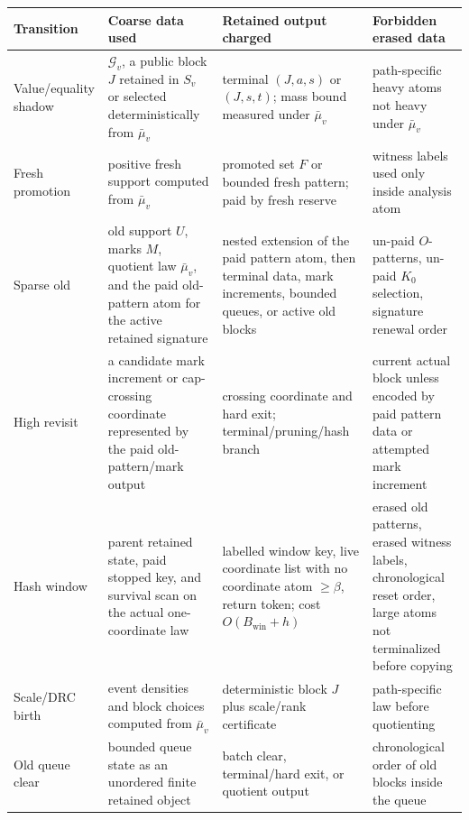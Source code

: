 \documentclass[11pt]{article}
\theoremstyle{remark}
\newcommand{\G}{\mathcal G}
\newcommand{\win}{\mathrm{win}}
\begin{document}
\begin{center}\small
\setlength{\tabcolsep}{3pt}
\renewcommand{\arraystretch}{1.15}
\begin{tabular}{>{\raggedright\arraybackslash}p{}
                >{\raggedright\arraybackslash}p{}
                >{\raggedright\arraybackslash}p{}
                >{\raggedright\arraybackslash}p{}}
\toprule
Transition & Coarse data used & Retained output charged & Forbidden erased data \\
\midrule
Value/equality shadow & $\G_v$, a public block $J$ retained in $S_v$ or selected deterministically from $\bar\mu_v$ & terminal $(J,a,s)$ or $(J,s,t)$; mass bound measured under $\bar\mu_v$ & path-specific heavy atoms not heavy under $\bar\mu_v$ \\
Fresh promotion & positive fresh support computed from $\bar\mu_v$ & promoted set $F$ or bounded fresh pattern; paid by fresh reserve & witness labels used only inside analysis atom \\
Sparse old & old support $U$, marks $M$, quotient law $\bar\mu_v$, and the paid old-pattern atom for the active retained signature & nested extension of the paid pattern atom, then terminal data, mark increments, bounded queues, or active old blocks & un-paid $O$-patterns, un-paid $K_0$ selection, signature renewal order \\
High revisit & a candidate mark increment or cap-crossing coordinate represented by the paid old-pattern/mark output & crossing coordinate and hard exit; terminal/pruning/hash branch & current actual block unless encoded by paid pattern data or attempted mark increment \\
Hash window & parent retained state, paid stopped key, and survival scan on the actual one-coordinate law & labelled window key, live coordinate list with no coordinate atom $\ge\beta$, return token; cost $O(B_{\win}+h)$ & erased old patterns, erased witness labels, chronological reset order, large atoms not terminalized before copying \\
Scale/DRC birth & event densities and block choices computed from $\bar\mu_v$ & deterministic block $J$ plus scale/rank certificate & path-specific law before quotienting \\
Old queue clear & bounded queue state as an unordered finite retained object & batch clear, terminal/hard exit, or quotient output & chronological order of old blocks inside the queue \\
\bottomrule
\end{tabular}
\end{center}
\end{document}
